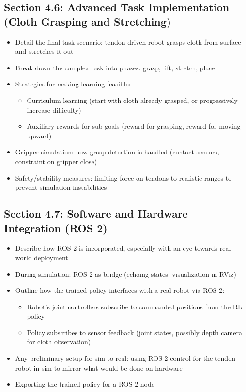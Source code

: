 \subsection{Section 4.6: Advanced Task Implementation (Cloth Grasping and Stretching)}
\begin{itemize}
    \item Detail the final task scenario: tendon-driven robot grasps cloth from surface and stretches it out
    \item Break down the complex task into phases: grasp, lift, stretch, place
    \item Strategies for making learning feasible:
    \begin{itemize}
        \item Curriculum learning (start with cloth already grasped, or progressively increase difficulty)
        \item Auxiliary rewards for sub-goals (reward for grasping, reward for moving upward)
    \end{itemize}
    \item Gripper simulation: how grasp detection is handled (contact sensors, constraint on gripper close)
    \item Safety/stability measures: limiting force on tendons to realistic ranges to prevent simulation instabilities
\end{itemize}

\subsection{Section 4.7: Software and Hardware Integration (ROS 2)}
\begin{itemize}
    \item Describe how ROS 2 is incorporated, especially with an eye towards real-world deployment
    \item During simulation: ROS 2 as bridge (echoing states, visualization in RViz)
    \item Outline how the trained policy interfaces with a real robot via ROS 2:
    \begin{itemize}
        \item Robot's joint controllers subscribe to commanded positions from the RL policy
        \item Policy subscribes to sensor feedback (joint states, possibly depth camera for cloth observation)
    \end{itemize}
    \item Any preliminary setup for sim-to-real: using ROS 2 control for the tendon robot in sim to mirror what would be done on hardware
    \item Exporting the trained policy for a ROS 2 node
\end{itemize}

